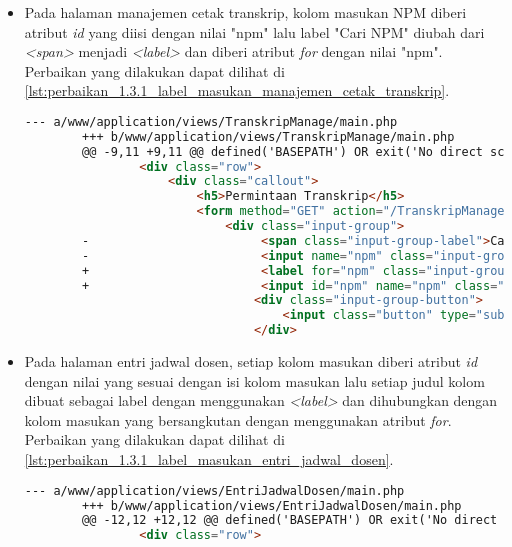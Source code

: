 \begin{itemize}
    \item Pada halaman manajemen cetak transkrip, kolom masukan NPM diberi atribut \textit{id} yang diisi dengan nilai "npm" lalu label "Cari NPM" diubah dari \textit{<span>} menjadi \textit{<label>} dan diberi atribut \textit{for} dengan nilai "npm". Perbaikan yang dilakukan dapat dilihat di \ref{lst:perbaikan_1.3.1_label_masukan_manajemen_cetak_transkrip}.
    \begin{lstlisting}[frame=single, label={lst:perbaikan_1.3.1_label_masukan_manajemen_cetak_transkrip}, language=HTML, caption=Perbaikan Kriteria Sukses 1.3.1 - Tidak Terdapat Label pada Kolom Masukan di Halaman Manajemen Cetak Transkrip]
        --- a/www/application/views/TranskripManage/main.php
        +++ b/www/application/views/TranskripManage/main.php
        @@ -9,11 +9,11 @@ defined('BASEPATH') OR exit('No direct script access allowed');
                <div class="row">
                    <div class="callout">
                        <h5>Permintaan Transkrip</h5>
                        <form method="GET" action="/TranskripManage">
                            <div class="input-group">
        -                        <span class="input-group-label">Cari NPM:</span>
        -                        <input name="npm" class="input-group-field" type="text" placeholder="2013730013" maxlength="10" minlength="10"<?= $npmQuery === NULL ? '' : " value='$npmQuery'" ?>/>
        +                        <label for="npm" class="input-group-label">Cari NPM:</label>
        +                        <input id="npm" name="npm" class="input-group-field" type="text" placeholder="2013730013" maxlength="10" minlength="10"<?= $npmQuery === NULL ? '' : " value='$npmQuery'" ?>/>
                                <div class="input-group-button">
                                    <input class="button" type="submit" value="Cari"/>
                                </div>
    \end{lstlisting}

    \item Pada halaman entri jadwal dosen, setiap kolom masukan diberi atribut \textit{id} dengan nilai yang sesuai dengan isi kolom masukan lalu setiap judul kolom dibuat sebagai label dengan menggunakan \textit{<label>} dan dihubungkan dengan kolom masukan yang bersangkutan dengan menggunakan atribut \textit{for}. Perbaikan yang dilakukan dapat dilihat di \ref{lst:perbaikan_1.3.1_label_masukan_entri_jadwal_dosen}.
    \begin{lstlisting}[frame=single, label={lst:perbaikan_1.3.1_label_masukan_entri_jadwal_dosen}, language=HTML, caption=Perbaikan Kriteria Sukses 1.3.1 - Tidak Terdapat Label pada Kolom Masukan di Halaman Entri Jadwal Dosen]
        --- a/www/application/views/EntriJadwalDosen/main.php
        +++ b/www/application/views/EntriJadwalDosen/main.php
        @@ -12,12 +12,12 @@ defined('BASEPATH') OR exit('No direct script access allowed');
                <div class="row">
        

\end{lstlisting}
\end{itemize}
